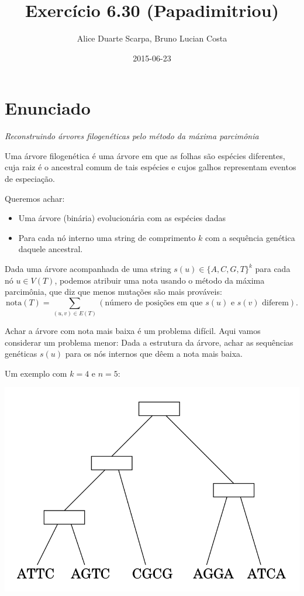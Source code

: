 \documentclass[11pt]{article}
\author{Alice Duarte Scarpa, Bruno Lucian Costa}
\date{2015-06-23}
\title{Exercício 6.30 (Papadimitriou)}
\begin{document}
\maketitle

\section{Enunciado}
\label{sec-1}

\textit{Reconstruindo árvores filogenéticas pelo método da máxima parcimônia}

Uma árvore filogenética é uma árvore em que as folhas são espécies
diferentes, cuja raiz é o ancestral comum de tais espécies e cujos
galhos representam eventos de especiação.

Queremos achar:

\begin{itemize}
\item Uma árvore (binária) evolucionária com as espécies dadas
\item Para cada nó interno uma string de comprimento $k$ com a
sequência genética daquele ancestral.
\end{itemize}


Dada uma árvore acompanhada de uma string $s(u) \in \{A, C, G, T\}^k$ para
cada nó $u \in V(T)$, podemos atribuir uma nota usando o método da
máxima parcimônia, que diz que menos mutações são mais prováveis:
\[ \mathrm{nota}(T) = \sum_{(u,v) \in E(T)} (\text{número de posições em que }s(u)\text{ e }s(v)\text{ diferem}). \]

Achar a árvore com nota mais baixa é um problema difícil. Aqui vamos
considerar um problema menor: Dada a estrutura da árvore, achar as
sequências genéticas $s(u)$ para os nós internos que dêem a nota mais
baixa.

Um exemplo com $k = 4$ e $n = 5$:

\href{http:github.com/adusca/FGV-EDA/6_30/tree.png}{\includegraphics[width=.9\linewidth]{6_30/tree.png}}
\end{document}
